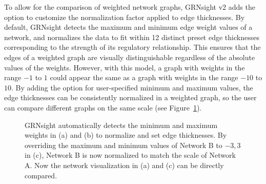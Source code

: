 \documentclass[sigconf,review]{acmart}
\begin{document}
To allow for the comparison of weighted network graphs, GRNsight v2 adds the option to customize the normalization factor applied to edge thicknesses. By default, GRNsight detects the maximum and minimum edge weight values of a network, and normalizes the data to fit within 12 distinct preset edge thicknesses corresponding to the strength of its regulatory relationship. This ensures that the edges of a weighted graph are visually distinguishable regardless of the absolute values of the weights. However, with this model, a graph with weights in the range \(-1\) to \(1\) could appear the same as a graph with weights in the range \(-10\) to \(10\). By adding the option for user-specified minimum and maximum values, the edge thicknesses can be consistently normalized in a weighted graph, so the user can compare different graphs on the same scale (see Figure~\ref{fig:network-screenshots}).

\begin{figure}[h]
    \centering
    \caption{GRNsight automatically detects the minimum and maximum weights in (a) and (b) to normalize and set edge thicknesses. By overriding the maximum and minimum values of Network B to \(-3, 3\) in (c), Network B is now normalized to match the scale of Network A. Now the network visualization in (a) and (c) can be directly compared.}
    \label{fig:network-screenshots}
\end{figure}
\end{document}
